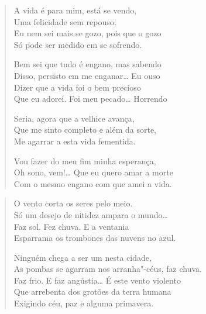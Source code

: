 
\begin{verse}
A vida é para mim, está se vendo,\\
Uma felicidade sem repouso;\\
Eu nem sei mais se gozo, pois que o gozo\\
Só pode ser medido em se sofrendo.

Bem sei que tudo é engano, mas sabendo\\
Disso, persisto em me enganar\ldots{} Eu ouso\\
Dizer que a vida foi o bem precioso\\
Que eu adorei. Foi meu pecado\ldots{} Horrendo

Seria, agora que a velhice avança,\\
Que me sinto completo e além da sorte,\\
Me agarrar a esta vida fementida.

Vou fazer do meu fim minha esperança,\\
Oh sono, vem!\ldots{} Que eu quero amar a morte\\
Com o mesmo engano com que amei a vida.
\end{verse}


\begin{verse}
O vento corta os seres pelo meio.\\
Só um desejo de nitidez ampara o mundo\ldots{}\\
Faz sol. Fez chuva. E a ventania\\
Esparrama os trombones das nuvens no azul.

Ninguém chega a ser um nesta cidade,\\
As pombas se agarram nos arranha"-céus, faz chuva.\\
Faz frio. E faz angústia\ldots{} É este vento violento\\
Que arrebenta dos grotões da terra humana\\
Exigindo céu, paz e alguma primavera.
\end{verse}


